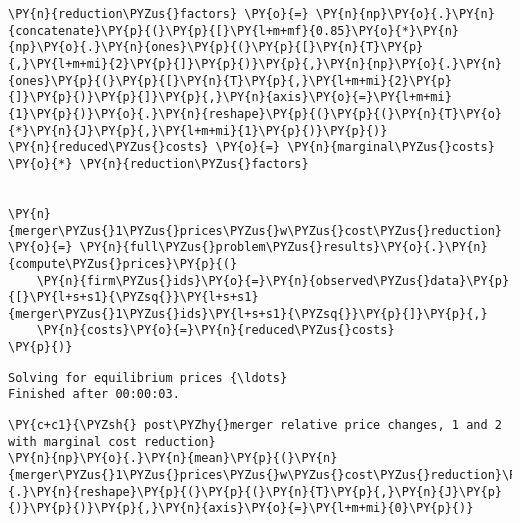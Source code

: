     \begin{tcolorbox}[breakable, size=fbox, boxrule=1pt, pad at break*=1mm,colback=cellbackground, colframe=cellborder]
\begin{Verbatim}[commandchars=\\\{\}]
\PY{n}{reduction\PYZus{}factors} \PY{o}{=} \PY{n}{np}\PY{o}{.}\PY{n}{concatenate}\PY{p}{(}\PY{p}{[}\PY{l+m+mf}{0.85}\PY{o}{*}\PY{n}{np}\PY{o}{.}\PY{n}{ones}\PY{p}{(}\PY{p}{[}\PY{n}{T}\PY{p}{,}\PY{l+m+mi}{2}\PY{p}{]}\PY{p}{)}\PY{p}{,}\PY{n}{np}\PY{o}{.}\PY{n}{ones}\PY{p}{(}\PY{p}{[}\PY{n}{T}\PY{p}{,}\PY{l+m+mi}{2}\PY{p}{]}\PY{p}{)}\PY{p}{]}\PY{p}{,}\PY{n}{axis}\PY{o}{=}\PY{l+m+mi}{1}\PY{p}{)}\PY{o}{.}\PY{n}{reshape}\PY{p}{(}\PY{p}{(}\PY{n}{T}\PY{o}{*}\PY{n}{J}\PY{p}{,}\PY{l+m+mi}{1}\PY{p}{)}\PY{p}{)}
\PY{n}{reduced\PYZus{}costs} \PY{o}{=} \PY{n}{marginal\PYZus{}costs} \PY{o}{*} \PY{n}{reduction\PYZus{}factors}


\PY{n}{merger\PYZus{}1\PYZus{}prices\PYZus{}w\PYZus{}cost\PYZus{}reduction} \PY{o}{=} \PY{n}{full\PYZus{}problem\PYZus{}results}\PY{o}{.}\PY{n}{compute\PYZus{}prices}\PY{p}{(}
    \PY{n}{firm\PYZus{}ids}\PY{o}{=}\PY{n}{observed\PYZus{}data}\PY{p}{[}\PY{l+s+s1}{\PYZsq{}}\PY{l+s+s1}{merger\PYZus{}1\PYZus{}ids}\PY{l+s+s1}{\PYZsq{}}\PY{p}{]}\PY{p}{,}
    \PY{n}{costs}\PY{o}{=}\PY{n}{reduced\PYZus{}costs}
\PY{p}{)}
\end{Verbatim}
\end{tcolorbox}

    \begin{Verbatim}[commandchars=\\\{\}]
Solving for equilibrium prices {\ldots}
Finished after 00:00:03.

    \end{Verbatim}

    \begin{tcolorbox}[breakable, size=fbox, boxrule=1pt, pad at break*=1mm,colback=cellbackground, colframe=cellborder]
\begin{Verbatim}[commandchars=\\\{\}]
\PY{c+c1}{\PYZsh{} post\PYZhy{}merger relative price changes, 1 and 2 with marginal cost reduction}
\PY{n}{np}\PY{o}{.}\PY{n}{mean}\PY{p}{(}\PY{n}{merger\PYZus{}1\PYZus{}prices\PYZus{}w\PYZus{}cost\PYZus{}reduction}\PY{o}{.}\PY{n}{reshape}\PY{p}{(}\PY{p}{(}\PY{n}{T}\PY{p}{,}\PY{n}{J}\PY{p}{)}\PY{p}{)}\PY{p}{,}\PY{n}{axis}\PY{o}{=}\PY{l+m+mi}{0}\PY{p}{)}
\end{Verbatim}
\end{tcolorbox}

